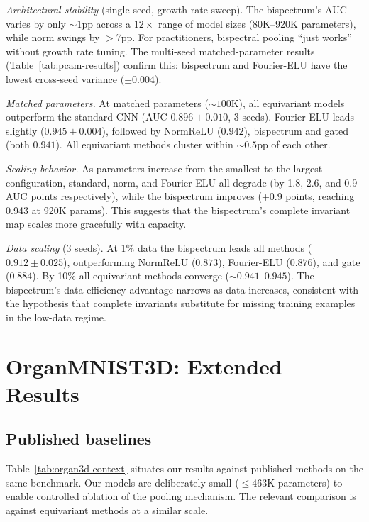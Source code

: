 \documentclass{article}
\theoremstyle{definition}
\theoremstyle{remark}
\theoremstyle{definition}
\begin{document}
\emph{Architectural stability} (single seed, growth-rate sweep).
The bispectrum's AUC varies by only ${\sim}1$pp across a $12\times$
range of model sizes (80K--920K parameters), while norm swings by
$>$7pp. For practitioners, bispectral pooling ``just works'' without
growth rate tuning. The multi-seed matched-parameter results
(Table~\ref{tab:pcam-results}) confirm this: bispectrum and Fourier-ELU
have the lowest cross-seed variance ($\pm 0.004$).

\emph{Matched parameters.}
At matched parameters (${\sim}100$K), all equivariant models outperform
the standard CNN (AUC $0.896 \pm 0.010$, 3 seeds). Fourier-ELU leads
slightly ($0.945 \pm 0.004$), followed by NormReLU ($0.942$), bispectrum
and gated (both $0.941$). All equivariant methods cluster within
${\sim}0.5$pp of each other.

\emph{Scaling behavior.}
As parameters increase from the smallest to the largest configuration,
standard, norm, and Fourier-ELU all degrade (by 1.8, 2.6, and 0.9
AUC points respectively), while the bispectrum improves (+0.9 points,
reaching 0.943 at 920K params). This suggests that the bispectrum's
complete invariant map scales more gracefully with capacity.

\emph{Data scaling} (3 seeds).
At 1\% data the bispectrum leads all methods ($0.912 \pm 0.025$),
outperforming NormReLU ($0.873$), Fourier-ELU ($0.876$), and gate
($0.884$). By 10\% all equivariant methods converge (${\sim}0.941$--$0.945$).
The bispectrum's data-efficiency advantage narrows as data increases,
consistent with the hypothesis that complete invariants substitute for
missing training examples in the low-data regime.

\section{OrganMNIST3D: Extended Results}
\label{app:organ3d-details}

\subsection{Published baselines}

Table~\ref{tab:organ3d-context} situates our results against published
methods on the same benchmark. Our models are deliberately small
(${\leq}463$K parameters) to enable controlled ablation of the pooling
mechanism. The relevant comparison is against equivariant methods at a
similar scale.
\end{document}
